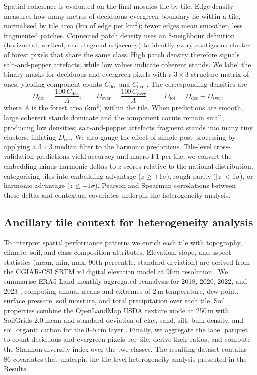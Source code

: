\documentclass[utf8]{FrontiersinHarvard}
\begin{document}
Spatial coherence is evaluated on the final mosaics tile by tile. Edge density measures how many metres of deciduous–evergreen boundary lie within a tile, normalised by tile area (km of edge per km$^2$); fewer edges mean smoother, less fragmented patches. Connected patch density uses an 8-neighbour definition (horizontal, vertical, and diagonal adjacency) to identify every contiguous cluster of forest pixels that share the same class. High patch density therefore signals salt-and-pepper artefacts, while low values indicate coherent stands. We label the binary masks for deciduous and evergreen pixels with a \(3\times3\) structure matrix of ones, yielding component counts \(C_{\text{dec}}\) and \(C_{\text{ever}}\). The corresponding densities are
\begin{equation*}
    D_{\text{dec}} = \frac{100\,C_{\text{dec}}}{A}, \qquad
    D_{\text{ever}} = \frac{100\,C_{\text{ever}}}{A}, \qquad
    D_{\text{tot}} = D_{\text{dec}} + D_{\text{ever}},
\end{equation*}
where \(A\) is the forest area (km$^2$) within the tile. When predictions are smooth, large coherent stands dominate and the component counts remain small, producing low densities; salt-and-pepper artefacts fragment stands into many tiny clusters, inflating \(D_{\text{tot}}\). We also gauge the effect of simple post-processing by applying a \(3 \times 3\) median filter to the harmonic predictions. Tile-level cross-validation predictions yield accuracy and macro-F1 per tile; we convert the embedding-minus-harmonic deltas to $z$-scores relative to the national distribution, categorising tiles into embedding advantage (\(z \ge +1\sigma\)), rough parity (\(|z| < 1\sigma\)), or harmonic advantage (\(z \le -1\sigma\)). Pearson and Spearman correlations between these deltas and contextual covariates underpin the heterogeneity analysis.

\subsection{Ancillary tile context for heterogeneity analysis}
To interpret spatial performance patterns we enrich each tile with topography, climate, soil, and class-composition attributes. Elevation, slope, and aspect statistics (mean, min, max, 90th percentile, standard deviation) are derived from the CGIAR-CSI SRTM v4 digital elevation model at 90\,m resolution \citep{Jarvis2008SRTM}. We summarise ERA5-Land monthly aggregated reanalysis for 2018, 2020, 2022, and 2023 \citep{MunozSabater2021ERA5Land}, computing annual means and extremes of 2\,m temperature, dew point, surface pressure, soil moisture, and total precipitation over each tile. Soil properties combine the OpenLandMap USDA texture mode at 250\,m \citep{Hengl2021OpenLandMap} with SoilGrids 2.0 mean and standard deviation of clay, sand, silt, bulk density, and soil organic carbon for the 0–5\,cm layer \citep{Poggio2021SoilGrids}. Finally, we aggregate the label parquet to count deciduous and evergreen pixels per tile, derive their ratios, and compute the Shannon diversity index over the two classes. The resulting dataset contains 86 covariates that underpin the tile-level heterogeneity analysis presented in the Results.
\end{document}
